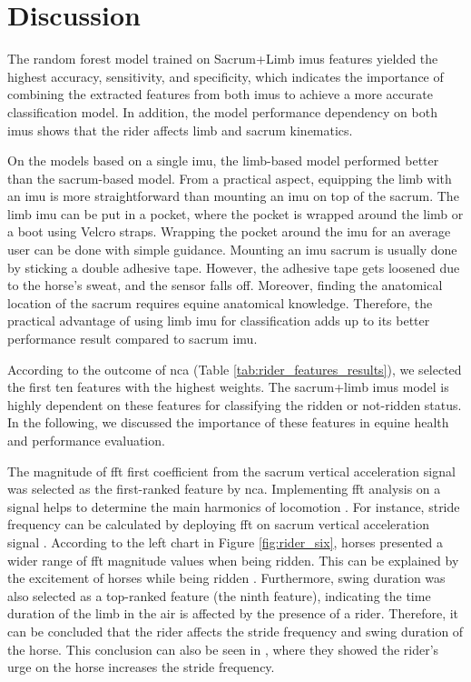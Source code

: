 \section{Discussion}
\label{sec:discussion}

The random forest model trained on Sacrum+Limb \gls{imu}s features yielded the highest accuracy, sensitivity, and specificity, which indicates the importance of combining the extracted features from both \gls{imu}s to achieve a more accurate classification model. In addition, the model performance dependency on both \gls{imu}s shows that the rider affects limb and sacrum kinematics. 

On the models based on a single \gls{imu}, the limb-based model performed better than the sacrum-based model. From a practical aspect, equipping the limb with an \gls{imu} is more straightforward than mounting an \gls{imu} on top of the sacrum. The limb \gls{imu} can be put in a pocket, where the pocket is wrapped around the limb or a boot using Velcro straps. Wrapping the pocket around the \gls{imu} for an average user can be done with simple guidance. Mounting an \gls{imu} sacrum is usually done by sticking a double adhesive tape. However, the adhesive tape gets loosened due to the horse's sweat, and the sensor falls off. Moreover, finding the anatomical location of the sacrum requires equine anatomical knowledge. Therefore, the practical advantage of using limb \gls{imu} for classification adds up to its better performance result compared to sacrum \gls{imu}.

According to the outcome of \gls{nca} (Table \ref{tab:rider_features_results}), we selected the first ten features with the highest weights. The sacrum+limb \gls{imu}s model is highly dependent on these features for classifying the ridden or not-ridden status. In the following, we discussed the importance of these features in equine health and performance evaluation.

The magnitude of \gls{fft} first coefficient from the sacrum vertical acceleration signal was selected as the first-ranked feature by \gls{nca}. Implementing \gls{fft} analysis on a signal helps to determine the main harmonics of locomotion \cite{hayati_2019_analysis}. For instance, stride frequency can be calculated by deploying \gls{fft} on sacrum vertical acceleration signal \cite{Barrey1999MethodsHorses}. According to the left chart in Figure \ref{fig:rider_six}, horses presented a wider range of \gls{fft} magnitude values when being ridden. This can be explained by the excitement of horses while being ridden \cite{hall_2013_assessment}. Furthermore, swing duration was also selected as a top-ranked feature (the ninth feature), indicating the time duration of the limb in the air is affected by the presence of a rider. Therefore, it can be concluded that the rider affects the stride frequency and swing duration of the horse. This conclusion can also be seen in \cite{deuel_1988_effects}, where they showed the rider's urge on the horse increases the stride frequency. 

